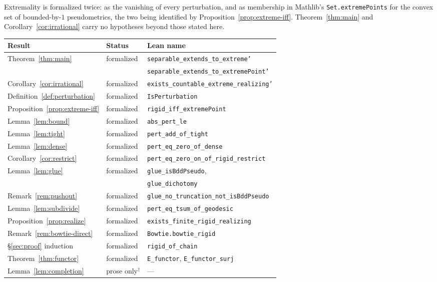 \documentclass[11pt]{article}
\theoremstyle{definition}
\theoremstyle{remark}
\begin{document}
Extremality is formalized twice: as the vanishing of every perturbation, and as membership
in Mathlib's \texttt{Set.extremePoints} for the convex set of bounded-by-$1$ pseudometrics,
the two being identified by Proposition~\ref{prop:extreme-iff}. Theorem~\ref{thm:main} and
Corollary~\ref{cor:irrational} carry no hypotheses beyond those stated here.

\begin{center}
\small
\begin{tabular}{lll}
\textbf{Result} & \textbf{Status} & \textbf{Lean name}\\
\hline
Theorem~\ref{thm:main} & formalized & \texttt{separable\_extends\_to\_extreme'}\\
 & & \texttt{separable\_extends\_to\_extremePoint'}\\
Corollary~\ref{cor:irrational} & formalized & \texttt{exists\_countable\_extreme\_realizing'}\\
Definition~\ref{def:perturbation} & formalized & \texttt{IsPerturbation}\\
Proposition~\ref{prop:extreme-iff} & formalized & \texttt{rigid\_iff\_extremePoint}\\
Lemma~\ref{lem:bound} & formalized & \texttt{abs\_pert\_le}\\
Lemma~\ref{lem:tight} & formalized & \texttt{pert\_add\_of\_tight}\\
Lemma~\ref{lem:dense} & formalized & \texttt{pert\_eq\_zero\_of\_dense}\\
Corollary~\ref{cor:restrict} & formalized & \texttt{pert\_eq\_zero\_on\_of\_rigid\_restrict}\\
Lemma~\ref{lem:glue} & formalized & \texttt{glue\_isBddPseudo},\\
 & & \texttt{glue\_dichotomy}\\
Remark~\ref{rem:pushout} & formalized & \texttt{glue\_no\_truncation\_not\_isBddPseudo}\\
Lemma~\ref{lem:subdivide} & formalized & \texttt{pert\_eq\_tsum\_of\_geodesic}\\
Proposition~\ref{prop:realize} & formalized & \texttt{exists\_finite\_rigid\_realizing}\\
Remark~\ref{rem:bowtie-direct} & formalized & \texttt{Bowtie.bowtie\_rigid}\\
\S\ref{sec:proof} induction & formalized & \texttt{rigid\_of\_chain}\\
Theorem~\ref{thm:functor} & formalized & \texttt{E\_functor}, \texttt{E\_functor\_surj}\\
Lemma~\ref{lem:completion} & prose only$^{\dagger}$ & ---\\

\end{tabular}
\end{center}
\end{document}
